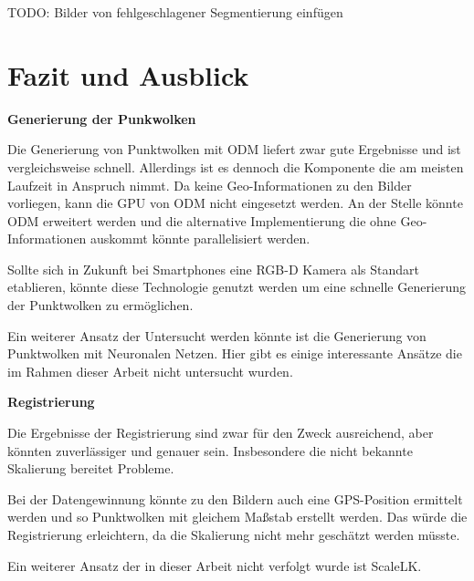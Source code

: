 \documentclass[12pt,titlepage, twoside]{article}
\begin{document}
TODO: Bilder von fehlgeschlagener Segmentierung einfügen

\newpage
\section{Fazit und Ausblick}
\label{sec:fazit}
%

\textbf{Generierung der Punkwolken}

Die Generierung von Punktwolken mit ODM liefert zwar gute Ergebnisse und ist vergleichsweise schnell. Allerdings ist es dennoch die Komponente die am meisten Laufzeit in Anspruch nimmt.
Da keine Geo-Informationen zu den Bilder vorliegen, kann die GPU von ODM nicht eingesetzt werden. An der Stelle könnte ODM erweitert werden und die alternative Implementierung die ohne Geo-Informationen auskommt könnte parallelisiert werden.

Sollte sich in Zukunft bei Smartphones eine RGB-D Kamera als Standart etablieren, könnte diese Technologie genutzt werden um eine schnelle Generierung der Punktwolken zu ermöglichen.

Ein weiterer Ansatz der Untersucht werden könnte ist die Generierung von Punktwolken mit Neuronalen Netzen. Hier gibt es einige interessante Ansätze die im Rahmen dieser Arbeit nicht untersucht wurden. 

\textbf{Registrierung}

Die Ergebnisse der Registrierung sind zwar für den Zweck ausreichend, aber könnten zuverlässiger und genauer sein. Insbesondere die nicht bekannte Skalierung bereitet Probleme.

Bei der Datengewinnung könnte zu den Bildern auch eine GPS-Position ermittelt werden und so Punktwolken mit gleichem Maßstab erstellt werden. Das würde die Registrierung erleichtern, da die Skalierung nicht mehr geschätzt werden müsste.

Ein weiterer Ansatz der in dieser Arbeit nicht verfolgt wurde ist ScaleLK.
\end{document}
